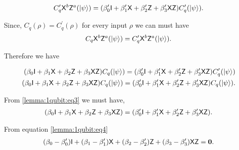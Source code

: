 \begin{equation}
\label{lemma:1qubit:eq2}
\begin{aligned}
 C_q^\prime {\sf X}^b {\sf Z}^a({\lvert}\psi\rangle)=(\beta_0^\prime {\sf I}+\beta_1^\prime {\sf X}+\beta_2^\prime {\sf Z}+\beta_3^\prime {\sf X} {\sf Z})  C_q^\prime ({\lvert}\psi\rangle).
 \end{aligned}
\end{equation}

Since,  $C_q (\rho)=C_q^\prime (\rho)$ for every input $\rho$ we can must have 
\begin{equation}
C_q {\sf X}^b {\sf Z}^a({\lvert}\psi\rangle)= C_q^\prime {\sf X}^b {\sf Z}^a({\lvert}\psi\rangle).
\end{equation}

Therefore we have 

\begin{equation}
\label{lemma:1qubit:eq3}
\begin{aligned}
(\beta_0 {\sf I}+\beta_1 {\sf X}+\beta_2 {\sf Z}+\beta_3 {\sf X} {\sf Z})  C_q ({\lvert}\psi\rangle)=(\beta_0^\prime {\sf I}+\beta_1^\prime {\sf X}+\beta_2^\prime {\sf Z}+\beta_3^\prime {\sf X} {\sf Z})  C_q^\prime ({\lvert}\psi\rangle)\\
(\beta_0 {\sf I}+\beta_1 {\sf X}+\beta_2 {\sf Z}+\beta_3 {\sf X} {\sf Z})  C_q ({\lvert}\psi\rangle)=(\beta_0^\prime {\sf I}+\beta_1^\prime {\sf X}+\beta_2^\prime {\sf Z}+\beta_3^\prime {\sf X} {\sf Z})  C_q({\lvert}\psi\rangle).\\
\end{aligned}
\end{equation}


From \ref{lemma:1qubit:eq3} we must have,
\begin{equation}
\label{lemma:1qubit:eq4}
\begin{aligned}
(\beta_0 {\sf I}+\beta_1 {\sf X}+\beta_2 {\sf Z}+\beta_3 {\sf X} {\sf Z}) =(\beta_0^\prime {\sf I}+\beta_1^\prime {\sf X}+\beta_2^\prime {\sf Z}+\beta_3^\prime {\sf X} {\sf Z}).\\
\end{aligned}
\end{equation}

From equation \ref{lemma:1qubit:eq4}
\begin{equation}
\label{lemma:1qubit:eq5}
\begin{aligned}
(\beta_0-\beta_0^\prime) {\sf I}+(\beta_1 -\beta_1^\prime){\sf X}+(\beta_2-\beta_2^\prime) {\sf Z}+(\beta_3-\beta^\prime_3) {\sf X} {\sf Z}={\bf 0}.
\end{aligned}
\end{equation}

